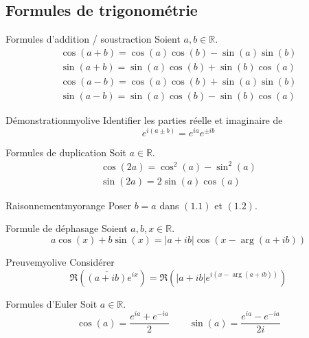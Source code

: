 \subsection{Formules de trigonométrie}

    \begin{prop}{Formules d’addition / soustraction}{}
        Soient $a,b \in \mathbb{R}$.
        \begin{align}
            \cos(a + b) = \cos(a)\cos(b) - \sin(a)\sin(b) \\
            \sin(a + b) = \sin(a)\cos(b) + \sin(b)\cos(a) \\
            \cos(a - b) = \cos(a)\cos(b) + \sin(a)\sin(b) \\
            \sin(a - b) = \sin(a)\cos(b) - \sin(b)\cos(a) 
        \end{align}
    \end{prop}

    \begin{demo}{Démonstration}{myolive}
        Identifier les parties réelle et imaginaire de 
        \[ e^{i(a \pm b)} = e^{ia}e^{\pm ib} \]
    \end{demo}

    \begin{coro}{Formules de duplication}{}
        Soit $a \in \mathbb{R}$.
        \begin{align}
            \cos(2a) = \cos^2(a) - \sin^2(a) \\
            \sin(2a) = 2\sin(a)\cos(a)
        \end{align}
    \end{coro}

    \begin{demo}{Raisonnement}{myorange}
        Poser $b = a$ dans $(1.1)$ et $(1.2)$.
    \end{demo}

    \begin{prop}{Formule de déphasage}{}
        Soient $a,b,x \in \mathbb{R}$.
        \[ a\cos(x) + b\sin(x) = |a + ib|\cos\left(x - \arg(a + ib) \right) \]        
    \end{prop}

    \begin{demo}{Preuve}{myolive}
        Considérer
        \[ \Re \left(\overline{(a + ib)}e^{ix} \right) = \Re \left(|a +ib|e^{i \left(x-\arg(a+ib) \right)} \right) \]
    \end{demo}

    \begin{theo}{Formules d’Euler}{}
        Soit $a \in \mathbb{R}$.
        \[ \cos(a) = \frac{e^{ia}+e^{-ia}}{2} \qquad \sin(a) = \frac{e^{ia}-e^{-ia}}{2i}\]
    \end{theo}

